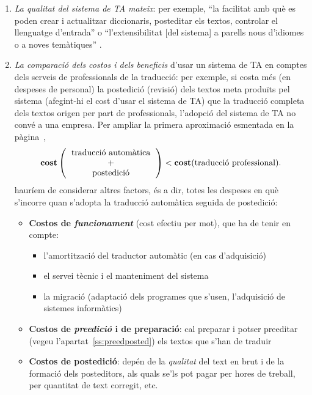 \begin{enumerate}
\begin{enumerate}
\item \emph{La qualitat del sistema de TA mateix}: per exemple, ``la facilitat amb
  què es poden crear i actualitzar diccionaris, posteditar els
  textos, controlar el llenguatge d'entrada'' o
  ``l'extensibilitat [del sistema] a parells nous d'idiomes o a noves temàtiques''
  \citep{hutchins96u}.
\item \label{pg:costdetall}
\emph{La comparació dels costos i dels beneficis} d'usar un
  sistema de TA en comptes dels serveis de professionals de la
  traducció: per exemple, si costa més (en despeses de personal) la
  postedició (revisió) dels textos meta produïts pel sistema
  (afegint-hi el cost d'usar el sistema de TA) que la traducció
  completa dels textos origen per part de professionals, l'adopció del
  sistema de TA no convé a una empresa. Per ampliar la primera
  aproximació esmentada en la pàgina~\pageref{pg:cost},
$$\textbf{cost}\left(\mbox{\begin{tabular}{c}traducció automàtica\\ +\\
      postedició\end{tabular}}\right) <
\textbf{cost}(\mbox{traducció professional}).
$$
hauríem de considerar altres factors, és a dir, totes les despeses en
què s'incorre quan s'adopta la traducció automàtica seguida de
postedició:
  \begin{itemize}
  \item \textbf{Costos de \emph{funcionament}} (cost efectiu per mot),
    que ha de tenir en compte:
    \begin{itemize}
    \item l'amortització del traductor automàtic (en cas d'adquisició)
    \item el servei tècnic i el manteniment del sistema
    \item la migració (adaptació dels programes que s'usen,
      l'adquisició de sistemes informàtics)
    \end{itemize}

  \item \textbf{Costos de \emph{preedició} i de preparació}: cal
    preparar i potser preeditar (vegeu l'apartat~\ref{ss:preedposted})
    els textos que s'han de traduir

  \item \textbf{Costos de postedició}: depén de la \emph{qualitat} del
    text en brut i de la formació dels posteditors, als quals se'ls
    pot pagar per hores de treball, per quantitat de text corregit,
    etc.


\end{itemize}
\end{enumerate}
\end{enumerate}
